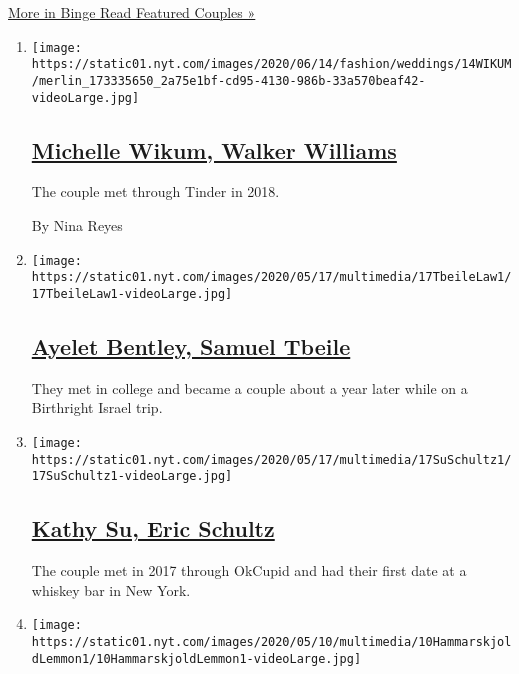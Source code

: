 \href{/spotlight/wedding-announcements}{More in Binge Read Featured
Couples »}

\begin{enumerate}
\def\labelenumi{\arabic{enumi}.}
\item
  \texttt{[image: https://static01.nyt.com/images/2020/06/14/fashion/weddings/14WIKUM/merlin\_173335650\_2a75e1bf-cd95-4130-986b-33a570beaf42-videoLarge.jpg]}

  \hypertarget{michelle-wikum-walker-williams}{%
  \subsection{\texorpdfstring{\href{/2020/06/14/fashion/weddings/michelle-wikum-walker-williams.html}{Michelle
  Wikum, Walker
  Williams}}{Michelle Wikum, Walker Williams}}\label{michelle-wikum-walker-williams}}

  The couple met through Tinder in 2018.

  By Nina Reyes
\item
  \texttt{[image: https://static01.nyt.com/images/2020/05/17/multimedia/17TbeileLaw1/17TbeileLaw1-videoLarge.jpg]}

  \hypertarget{ayelet-bentley-samuel-tbeile}{%
  \subsection{\texorpdfstring{\href{/2020/05/17/fashion/weddings/ayelet-bentley-samuel-tbeile.html}{Ayelet
  Bentley, Samuel
  Tbeile}}{Ayelet Bentley, Samuel Tbeile}}\label{ayelet-bentley-samuel-tbeile}}

  They met in college and became a couple about a year later while on a
  Birthright Israel trip.
\item
  \texttt{[image: https://static01.nyt.com/images/2020/05/17/multimedia/17SuSchultz1/17SuSchultz1-videoLarge.jpg]}

  \hypertarget{kathy-su-eric-schultz}{%
  \subsection{\texorpdfstring{\href{/2020/05/17/fashion/weddings/kathy-su-eric-schultz.html}{Kathy
  Su, Eric
  Schultz}}{Kathy Su, Eric Schultz}}\label{kathy-su-eric-schultz}}

  The couple met in 2017 through OkCupid and had their first date at a
  whiskey bar in New York.
\item
  \texttt{[image: https://static01.nyt.com/images/2020/05/10/multimedia/10HammarskjoldLemmon1/10HammarskjoldLemmon1-videoLarge.jpg]}


\end{enumerate}
